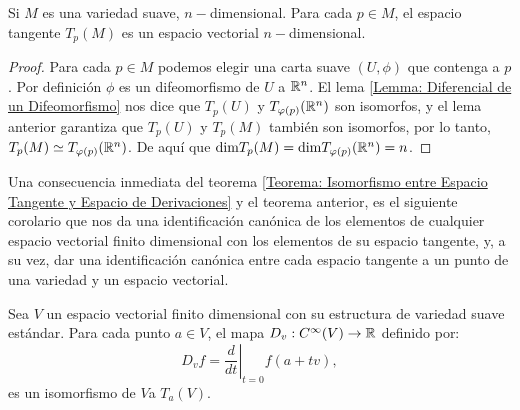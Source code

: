 \begin{theorem}\label{Teorema: Invariancia de la Dimensión}
	Si $M$ es una variedad suave, $n-$dimensional. Para cada $p \in M$, el espacio tangente $T_p(M)$ es un espacio vectorial $n-$dimensional.
\end{theorem}

\begin{proof}
	Para cada $p \in M$ podemos elegir una carta suave $(U, \phi)$ que contenga a $p$. Por definición $\phi$ es un difeomorfismo de $U$ a $\mathbb{R}^n$. El lema \ref{Lemma: Diferencial de un Difeomorfismo} nos dice que $T_{p}(U)$ y $T_{\varphi(p)}(\mathbb{R}^n)$ son isomorfos, y el lema anterior garantiza que $T_{p}(U)$ y $T_{p}(M)$ también son isomorfos, por lo tanto, $T_{p}(M) \simeq T_{\varphi(p)}(\mathbb{R}^n)$. De aquí que $\mathrm{dim} T_p(M) = \mathrm{dim} T_{\varphi(p)}(\mathbb{R}^n) = n$.
\end{proof}

Una consecuencia inmediata del teorema \ref{Teorema: Isomorfismo entre Espacio Tangente y Espacio de Derivaciones} y el teorema anterior, es el siguiente corolario que nos da una identificación canónica de los elementos de cualquier espacio vectorial finito dimensional con los elementos de su espacio tangente, y, a su vez, dar una identificación canónica entre cada espacio tangente a un punto de una variedad y un espacio vectorial.

\begin{corollary}
	Sea $V$ un espacio vectorial finito dimensional con su estructura de variedad suave estándar. Para cada punto $a \in V$, el mapa $D_v: C^{\infty}(V) \to \mathbb{R}$ definido por:
	\[D_vf = \left. \frac{d}{dt} \right|_{t=0} f(a+tv), \]
	es un isomorfismo de $V$a $T_a(V)$.
\end{corollary}
